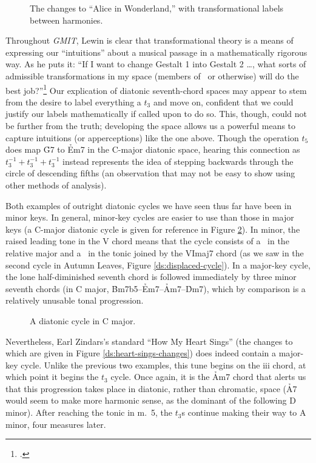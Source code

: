 \begin{figure}[h!btp]
  \caption{The changes to “Alice in Wonderland,” with transformational labels
  between harmonies.}
  \label{ds:wonderland-transformations}
\end{figure}

Throughout \emph{GMIT}, Lewin is clear that transformational theory is a means
of expressing our “intuitions” about a musical passage in a mathematically
rigorous way. As he puts it: “If I want to change Gestalt 1 into
Gestalt 2 \ldots, what sorts of admissible transformations in my space
(members of \strans\ or otherwise) will do the best
job?”\footcite[159]{lewin:gmit} Our explication of diatonic seventh-chord
spaces may appear to stem from the desire to label everything a $t_3$ and move
on, confident that we could justify our labels mathematically if called upon
to do so. This, though, could not be further from the truth; developing the
space allows us a powerful means to capture intuitions (or apperceptions) like
the one above. Though the operation $t_5$ does map \h{G7} to \h{Em7} in the
C-major diatonic space, hearing this connection as $t_3^{-1} + t_3^{-1} +
t_3^{-1}$ instead represents the idea of stepping backwards through the circle
of descending fifths (an observation that may not be easy to show using other
methods of analysis).

Both examples of outright diatonic cycles we have seen thus far have been in
minor keys. In general, minor-key cycles are easier to use than those in major
keys (a C-major diatonic cycle is given for reference in Figure
\ref{ds:major-cycle}). In minor, the raised leading tone in the V chord means
that the cycle consists of a \tfo\ in the relative major and a \tfo\ in the
tonic joined by the VImaj7 chord (as we saw in the second cycle in Autumn
Leaves, Figure \ref{ds:displaced-cycle}). In a major-key cycle, the lone
half-diminished seventh chord is followed immediately by three minor seventh
chords (in C major, \h{Bm7b5}--\h{Em7}--\h{Am7}--\h{Dm7}), which by comparison
is a relatively unusable tonal progression.

\begin{figure}[htbp]
  \caption{A diatonic cycle in C major.}
  \label{ds:major-cycle}
\end{figure}

Nevertheless, Earl Zindars’s standard “How My Heart Sings” (the changes to
which are given in Figure \ref{ds:heart-sings-changes}) does indeed contain a
major-key cycle. Unlike the previous two examples, this tune begins
on the iii chord, at which point it begins the $t_3$ cycle. Once again, it is
the \h{Am7} chord that alerts us that this progression takes place in
diatonic, rather than chromatic, space (\h{A7} would seem to make more
harmonic sense, as the dominant of the following D minor). After reaching the
tonic in m.~5, the $t_3$s continue making their way to A minor, four measures
later.

